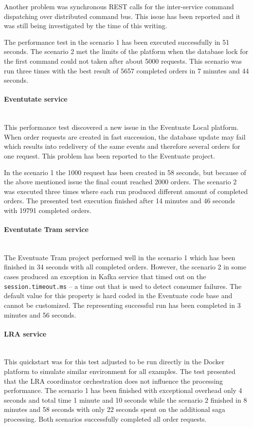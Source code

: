 \documentclass[oneside,
  digital, %
  table,   %
  lof,     %
  lot,     %
]{fithesis3}
\newcommand{\newlinepar}[1]{\paragraph{#1}\needspace{4\baselineskip}\mbox{}\\}
\begin{document}
Another problem was synchronous REST calls for the inter-service command dispatching over distributed command bus. This issue has been reported and it was still being investigated by the time of this writing.

The performance test in the scenario 1 has been executed successfully in 51 seconds. The scenario 2 met the limits of the platform when the database lock for the first command could not taken after about 5000 requests. This scenario was run three times with the best result of 5657 completed orders in 7 minutes and 44 seconds.

\newlinepar{Eventutate service}

This performance test discovered a new issue in the Eventuate Local platform. When order requests are created in fast succession, the database update may fail which results into redelivery of the same events and therefore several orders for one request. This problem has been reported to the Eventuate project.

In the scenario 1 the 1000 request has been created in 58 seconds, but because of the above mentioned issue the final count reached 2000 orders. The scenario 2 was executed three times where each run produced different amount of completed orders. The presented test execution finished after 14 minutes and 46 seconds with 19791 completed orders.

\newlinepar{Eventutate Tram service}

The Eventuate Tram project performed well in the scenario 1 which has been finished in 34 seconds with all completed orders. However, the scenario 2 in some cases produced an exception in Kafka service that timed out on the \texttt{session.timeout.ms} -- a time out that is used to detect consumer failures. The default value for this property is hard coded in the Eventuate code base and cannot be customized. The representing successful run has been completed in 3 minutes and 56 seconds.

\newlinepar{LRA service}

This quickstart was for this test adjusted to be run directly in the Docker platform to simulate similar environment for all examples. The test presented that the LRA coordinator orchestration does not influence the processing performance. The scenario 1 has been finished with  exceptional overhead only 4 seconds and total time 1 minute and 10 seconds while the scenario 2 finished in 8 minutes and 58 seconds with only 22 seconds spent on the additional saga processing. Both scenarios successfully completed all order requests.
\end{document}
